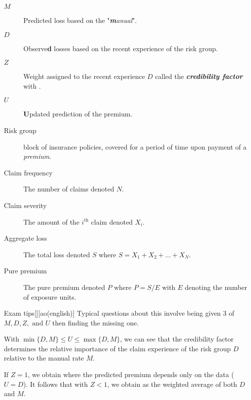 \documentclass[english]{article}
\begin{document}
\begin{multicols*}{2}
\begin{distributions}[Notation]
\begin{description}
	\item[$M$]	Predicted loss based on the "\textit{\textbf{m}anual}".
	\item[$D$]	Observe\textbf{d} losses based on the recent experience of the risk group.
	\item[$Z$]	Weight assigned to the recent experience $D$ called the \textbf{\textit{credibility factor}} with . 
	\item[$U$]	\textbf{U}pdated prediction of the premium.
\end{description}
\end{distributions}

\begin{distributions}[Terminology]
\begin{description}
	\item[Risk group]	block of insurance policies, covered for a period of time upon payment of a \textit{premium}.
	\item[Claim frequency]	The number of claims denoted $N$.
	\item[Claim severity]	The amount of the $i^{\text{th}}$ claim denoted $X_{i}$.
	\item[Aggregate loss]	The total loss denoted $S$ where $S = X_{1} + X_{2} + \hdots + X_{N}$.
	\item[Pure premium]	The pure premium denoted $P$ where $P = S/E$ with $E$ denoting the number of exposure units.
\end{description}
\end{distributions}

\begin{definitionGENERAL}{Exam tips}[][ao(english)]
Typical questions about this involve being given 3 of $M, D, Z, \text{ and } U$ then finding the missing one.
\end{definitionGENERAL}


\begin{rappel_enhanced}[Context]
With $\min\{D, M\} \leq U \leq \max\{D, M\}$, we can see that the credibility factor determines the relative importance of the claim experience of the risk group $D$ relative to the manual rate $M$.

\bigskip

If $Z = 1$, we obtain \textit{\underline{}} where the predicted premium depends only on the data ($U = D$). It follows that with $Z < 1$, we obtain \textit{\underline{}} as the weighted average of both $D$ and $M$.
\end{rappel_enhanced}



\end{multicols*}
\end{document}
